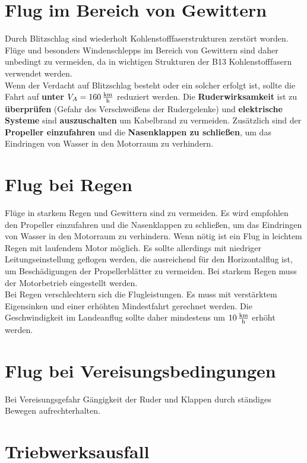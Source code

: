 \section{Flug im Bereich von Gewittern}
Durch Blitzschlag sind wiederholt Kohlenstofffaserstrukturen zerstört worden. Flüge und besonders Windenschlepps im Bereich von Gewittern sind daher unbedingt zu vermeiden, da in wichtigen Strukturen der B13 Kohlenstofffasern verwendet werden.\\
Wenn der Verdacht auf Blitzschlag besteht oder ein solcher erfolgt ist, sollte die Fahrt auf \textbf{unter $V_A=\unit[160]{\frac{km}{h}}$} reduziert werden. Die \textbf{Ruderwirksamkeit} ist zu \textbf{überprüfen} (Gefahr des Verschweißens der Rudergelenke) und \textbf{elektrische Systeme} sind \textbf{auszuschalten} um Kabelbrand zu vermeiden.
Zusätzlich sind der \textbf{Propeller einzufahren} und die \textbf{Nasenklappen zu schließen}, um das Eindringen von Wasser in den Motorraum zu verhindern.



\section{Flug bei Regen}
Flüge in starkem Regen und Gewittern sind zu vermeiden. Es wird empfohlen den Propeller einzufahren und die Nasenklappen zu schließen, um das Eindringen von Wasser in den Motorraum zu verhindern.
Wenn nötig ist ein Flug in leichtem Regen mit laufendem Motor möglich. Es sollte allerdings mit niedriger Leitungseinstellung geflogen werden, die ausreichend für den Horizontalflug ist, um Beschädigungen der Propellerblätter zu vermeiden. Bei starkem Regen muss der Motorbetrieb eingestellt werden. \\

Bei Regen verschlechtern sich die Flugleistungen. Es muss mit verstärktem Eigensinken und einer erhöhten Mindestfahrt gerechnet werden. Die Geschwindigkeit im Landeanflug sollte daher mindestens um $\unit[10]{\frac{km}{h}}$ erhöht werden. 

\section{Flug bei Vereisungsbedingungen}
Bei Vereisungsgefahr Gängigkeit der Ruder und Klappen durch ständiges Bewegen aufrechterhalten.
\newpage
\section{Triebwerksausfall}
